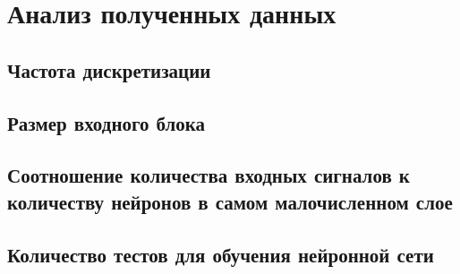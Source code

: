 \section{Анализ полученных данных}
\label{sec:analysis}

\subsection{Частота дискретизации}
\label{sub:analysis:discrete}

\subsection{Размер входного блока}
\label{sub:analysis:input}

\subsection{Соотношение количества входных сигналов к количеству нейронов в самом малочисленном слое}
\label{sub:analysis:output}

\subsection{Количество тестов для обучения нейронной сети}
\label{sub:analysis:tests}
